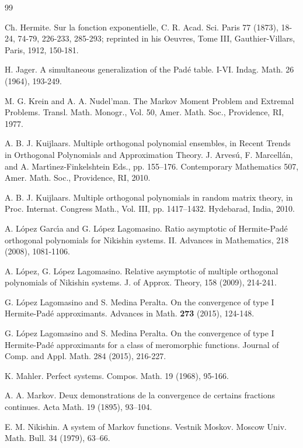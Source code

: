 \documentclass{amsart}
\theoremstyle{definition}
\theoremstyle{remark}
\begin{document}
\begin{thebibliography}{99}

 Ch. Hermite.  Sur la fonction exponentielle, C. R. Acad. Sci. Paris  77 (1873), 18-24, 74-79, 226-233, 285-293; reprinted in his Oeuvres, Tome III, Gauthier-Villars, Paris, 1912, 150-181.

  H. Jager. A simultaneous generalization of the Pad\'{e} table. I-VI. Indag. Math. 26 (1964), 193-249.

  M. G. Krein and  A. A. Nudel'man.  The Markov Moment Problem and Extremal
Problems. Transl. Math. Monogr., Vol. 50, Amer. Math. Soc., Providence, RI, 1977.

  A. B. J. Kuijlaars. Multiple orthogonal polynomial ensembles, in Recent Trends in Orthogonal Polynomials and Approximation Theory. J. Arves\'u, F. Marcell\'an, and A. Mart\'{\i}nez-Finkelshtein Eds., pp. 155--176. Contemporary Mathematics 507, Amer. Math. Soc., Providence, RI, 2010.

 A. B. J. Kuijlaars.  Multiple orthogonal polynomials in random matrix theory, in Proc. Internat. Congress Math., Vol. III, pp. 1417--1432.  Hydebarad, India, 2010.

  A. L\'{o}pez Garc\'{\i}a and G. L\'{o}pez Lagomasino. Ratio asymptotic of Hermite-Pad\'e orthogonal polynomials for Nikishin systems. II. Advances in Mathematics, 218 (2008), 1081-1106.

 A. L\'opez, G. L\'opez Lagomasino. Relative asymptotic of multiple orthogonal polynomials of Nikishin systems. J. of Approx. Theory, 158 (2009), 214-241.

 G. L\'opez Lagomasino and S. Medina Peralta.  On the convergence of type I Hermite-Pad\'e approximants.  Advances in Math. {\bf 273} (2015), 124-148.

 G. L\'opez Lagomasino and S. Medina Peralta. On the convergence of type I Hermite-Padé approximants for a class of meromorphic functions. Journal of Comp. and Appl. Math. 284 (2015), 216-227.

K. Mahler. Perfect systems. Compos. Math.  19 (1968), 95-166.

  A. A. Markov. Deux demonstrations de la convergence de certains fractions continues. Acta Math.  19 (1895), 93--104.

E. M. Nikishin. A system of Markov functions. Vestnik Moskov. Moscow Univ. Math. Bull. 34 (1979), 63--66.


\end{thebibliography}
\end{document}
